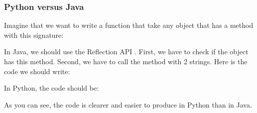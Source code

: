 
\subsubsection{Python versus Java}
Imagine that we want to write a function that take any object that has a method with this signature:


In Java, we should use the Reflection API \cite{python_more_fun_java}. First, we have to check if the object has this method. Second, we have to call the method with 2 strings. Here is the code we should write:


In Python, the code should be:


As you can see, the code is clearer and easier to produce in Python than in Java.
